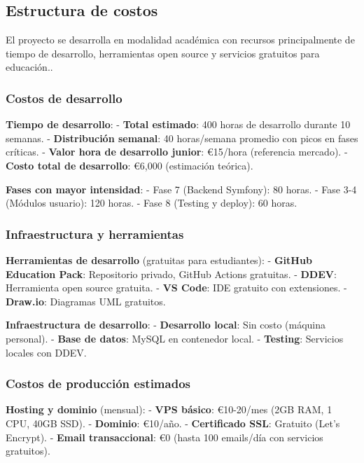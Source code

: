 \documentclass[12pt,a4paper,oneside]{report}
\begin{document}
\subsection{Estructura de costos}\label{estructura-de-costos}

El proyecto se desarrolla en modalidad académica con recursos
principalmente de tiempo de desarrollo, herramientas open source y
servicios gratuitos para educación..

\subsubsection{Costos de desarrollo}\label{costos-de-desarrollo}

\textbf{Tiempo de desarrollo}: - \textbf{Total estimado}: 400 horas de
desarrollo durante 10 semanas. - \textbf{Distribución semanal}: 40
horas/semana promedio con picos en fases críticas. - \textbf{Valor hora
de desarrollo junior}: €15/hora (referencia mercado). - \textbf{Costo
total de desarrollo}: €6,000 (estimación teórica).

\textbf{Fases con mayor intensidad}: - Fase 7 (Backend Symfony): 80
horas. - Fase 3-4 (Módulos usuario): 120 horas. - Fase 8 (Testing y
deploy): 60 horas.

\subsubsection{Infraestructura y
herramientas}\label{infraestructura-y-herramientas}

\textbf{Herramientas de desarrollo} (gratuitas para estudiantes): -
\textbf{GitHub Education Pack}: Repositorio privado, GitHub Actions
gratuitas. - \textbf{DDEV}: Herramienta open source gratuita. -
\textbf{VS Code}: IDE gratuito con extensiones. - \textbf{Draw.io}:
Diagramas UML gratuitos.

\textbf{Infraestructura de desarrollo}: - \textbf{Desarrollo local}: Sin
costo (máquina personal). - \textbf{Base de datos}: MySQL en contenedor
local. - \textbf{Testing}: Servicios locales con DDEV.

\subsubsection{Costos de producción
estimados}\label{costos-de-producciuxf3n-estimados}

\textbf{Hosting y dominio} (mensual): - \textbf{VPS básico}: €10-20/mes
(2GB RAM, 1 CPU, 40GB SSD). - \textbf{Dominio}: €10/año. -
\textbf{Certificado SSL}: Gratuito (Let's Encrypt). - \textbf{Email
transaccional}: €0 (hasta 100 emails/día con servicios gratuitos).
\end{document}
